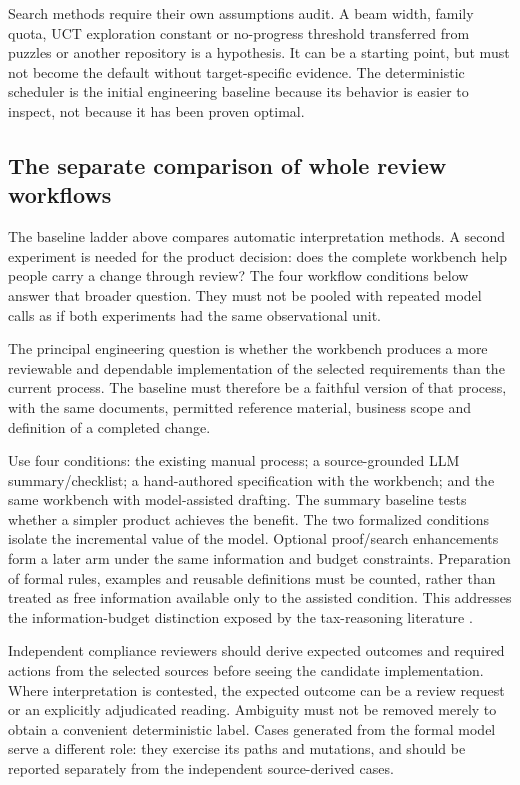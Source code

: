 Search methods require their own assumptions audit. A beam width, family quota,
UCT exploration constant or no-progress threshold transferred from puzzles or
another repository is a hypothesis. It can be a starting point, but must not
become the default without target-specific evidence. The deterministic scheduler
is the initial engineering baseline because its behavior is easier to inspect,
not because it has been proven optimal.

\subsection{The separate comparison of whole review workflows}

The baseline ladder above compares automatic interpretation methods. A second
experiment is needed for the product decision: does the complete workbench help
people carry a change through review? The four workflow conditions below answer
that broader question. They must not be pooled with repeated model calls as if
both experiments had the same observational unit.


\label{merge:P-04-prototype:04}


The principal engineering question is whether the workbench produces a more
reviewable and dependable implementation of the selected requirements than the
current process. The baseline must therefore be a faithful version of that
process, with the same documents, permitted reference material, business scope and
definition of a completed change.

Use four conditions: the existing manual process; a source-grounded LLM
summary/checklist; a hand-authored specification with the workbench; and the same
workbench with model-assisted drafting. The summary baseline tests whether a
simpler product achieves the benefit. The two formalized conditions isolate the
incremental value of the model. Optional proof/search enhancements form a later
arm under the same information and budget constraints. Preparation of formal
rules, examples and reusable definitions must be counted, rather than treated as
free information available only to the assisted condition. This addresses the
information-budget distinction exposed by the tax-reasoning literature
\citep{jurayj2026}.

Independent compliance reviewers should derive expected outcomes and required
actions from the selected sources before seeing the candidate implementation.
Where interpretation is contested, the expected outcome can be a review request
or an explicitly adjudicated reading. Ambiguity must not be removed merely to
obtain a convenient deterministic label. Cases generated from the formal model
serve a different role: they exercise its paths and mutations, and should be
reported separately from the independent source-derived cases.

